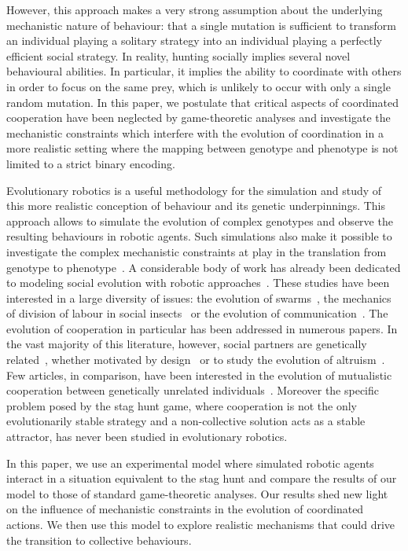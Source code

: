     However, this approach makes a very strong assumption about the underlying mechanistic nature of behaviour: that a single mutation is sufficient to transform an individual playing a solitary strategy into an individual playing a perfectly efficient social strategy. In reality, hunting socially implies several novel behavioural abilities. In particular, it implies the ability to coordinate with others in order to focus on the same prey, which is unlikely to occur with only a single random mutation. In this paper, we postulate that critical aspects of coordinated cooperation have been neglected by game-theoretic analyses and investigate the mechanistic constraints which interfere with the evolution of coordination in a more realistic setting where the mapping between genotype and phenotype is not limited to a strict binary encoding. 

    Evolutionary robotics is a useful methodology for the simulation and study of this more realistic conception of behaviour and its genetic underpinnings\cite{Nolfi2004, Doncieux2015}. This approach allows to simulate the evolution of complex genotypes and observe the resulting behaviours in robotic agents. Such simulations also make it possible to investigate the complex mechanistic constraints at play in the translation from genotype to phenotype~\cite{Mitri2012}. A considerable body of work has already been dedicated to modeling social evolution with robotic approaches~\cite{Trianni2014}. These studies have been interested in a large diversity of issues: the evolution of swarms~\cite{Olson2013}, the mechanics of division of labour in social insects~\cite{Tarapore2010, Ferrante2015} or the evolution of communication~\cite{Floreano2007, Mitri2011, Wischmann2012, Solomon2012}. The evolution of cooperation in particular has been addressed in numerous papers. In the vast majority of this literature, however, social partners are genetically related~\cite{Waibel2009}, whether motivated by design~\cite{Hauert2010, Trianni2007} or to study the evolution of altruism~\cite{Waibel2011, Montanier2013}. Few articles, in comparison, have been interested in the evolution of mutualistic cooperation between genetically unrelated individuals~\cite{Solomon2012}. Moreover the specific problem posed by the stag hunt game, where cooperation is not the only evolutionarily stable strategy and a non-collective solution acts as a stable attractor, has never been studied in evolutionary robotics.

    In this paper, we use an experimental model where simulated robotic agents interact in a situation equivalent to the stag hunt and compare the results of our model to those of standard game-theoretic analyses. Our results shed new light on the influence of mechanistic constraints in the evolution of coordinated actions. We then use this model to explore realistic mechanisms that could drive the transition to collective behaviours.

